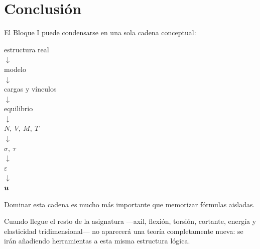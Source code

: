\chapter*{Conclusión}

El Bloque I puede condensarse en una sola cadena conceptual:

\begin{center}
\begin{tcolorbox}[
  width=0.48\linewidth,
  colback=grisclaro,
  colframe=gris,
  boxrule=0.6pt,
  arc=1.5mm
]
\centering
estructura real\\
$\downarrow$\\
modelo\\
$\downarrow$\\
cargas y vínculos\\
$\downarrow$\\
equilibrio\\
$\downarrow$\\
$N,\ V,\ M,\ T$\\
$\downarrow$\\
$\sigma,\ \tau$\\
$\downarrow$\\
$\varepsilon$\\
$\downarrow$\\
$\boldsymbol{u}$
\end{tcolorbox}
\end{center}

Dominar esta cadena es mucho más importante que memorizar fórmulas aisladas.

Cuando llegue el resto de la asignatura ---axil, flexión, torsión, cortante, energía y elasticidad tridimensional--- no aparecerá una teoría completamente nueva: se irán añadiendo herramientas a esta misma estructura lógica.
